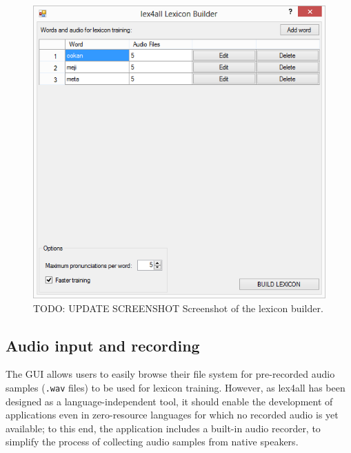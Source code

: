 \documentclass[11pt]{article}
\begin{document}
\begin{figure}[tb]
\begin{center}
\includegraphics[width=\columnwidth]{../screenshots/LexiconBuilder-Main-Filled.PNG}
\caption{TODO: UPDATE SCREENSHOT Screenshot of the lexicon builder.\label{fig:mainform}}
\end{center}
\end{figure}

\subsection{Audio input and recording}
\label{sec:recording}


The GUI allows users to easily browse their file system for pre-recorded audio samples (\texttt{.wav} files) to be used for lexicon training. However, as lex4all has been designed as a language-independent tool, it should enable the development of applications even in zero-resource languages for which no recorded audio is yet available; to this end, the application includes a built-in audio recorder, to simplify the process of collecting audio samples from native speakers.
\end{document}
